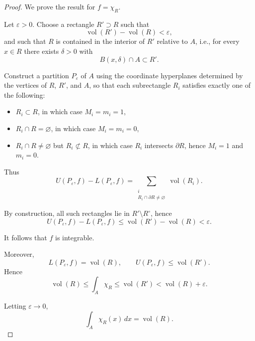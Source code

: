 \documentclass[11pt,openany]{book}
\theoremstyle{plain}
\theoremstyle{definition}
\theoremstyle{remark}
\newcommand{\vol}{\operatorname{vol}}
\begin{document}
\begin{proof}
We prove the result for $f = \chi_R$.

Let $\varepsilon > 0$. Choose a rectangle $R' \supset R$ such that 
\[
\vol(R') - \vol(R) < \varepsilon,
\]
and such that $R$ is contained in the interior of $R'$ relative to $A$, i.e., for every $x \in R$ there exists $\delta > 0$ with
\[
B(x,\delta) \cap A \subset R'.
\]

Construct a partition $P_\varepsilon$ of $A$ using the coordinate hyperplanes determined by the vertices of $R$, $R'$, and $A$, so that each subrectangle $R_i$ satisfies exactly one of the following:

\begin{itemize}
    \item $R_i \subset R$, in which case $M_i = m_i = 1$,
    \item $R_i \cap R = \varnothing$, in which case $M_i = m_i = 0$,
    \item $R_i \cap R \neq \varnothing$ but $R_i \not\subset R$, in which case $R_i$ intersects $\partial R$, hence $M_i = 1$ and $m_i = 0$.
\end{itemize}

Thus
\[
U(P_\varepsilon,f) - L(P_\varepsilon,f)
= \sum_{\substack{i \\ R_i \cap \partial R \neq \varnothing}} \vol(R_i).
\]

By construction, all such rectangles lie in $R' \setminus R^\circ$, hence
\[
U(P_\varepsilon,f) - L(P_\varepsilon,f)
\le \vol(R') - \vol(R) < \varepsilon.
\]

It follows that $f$ is integrable.

Moreover,
\[
L(P_\varepsilon,f) = \vol(R), \qquad
U(P_\varepsilon,f) \le \vol(R').
\]
Hence
\[
\vol(R) \le \int_A \chi_R \le \vol(R') < \vol(R) + \varepsilon.
\]

Letting $\varepsilon \to 0$,
\[
\int_A \chi_R(x)\,dx = \vol(R).
\]
\end{proof}
\end{document}
